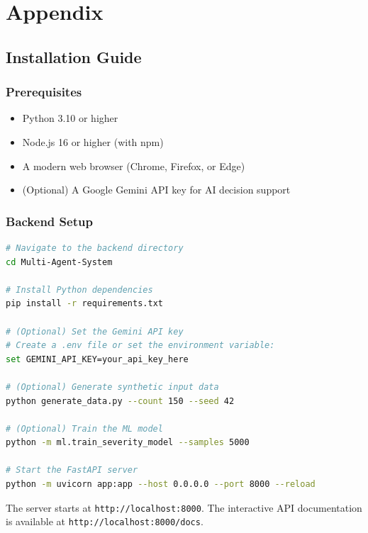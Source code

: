 \appendix

\chapter{Appendix}
\label{ch:appendix}

\section{Installation Guide}
\label{sec:installation_guide}

\subsection{Prerequisites}

\begin{itemize}[leftmargin=*]
    \item Python 3.10 or higher
    \item Node.js 16 or higher (with npm)
    \item A modern web browser (Chrome, Firefox, or Edge)
    \item (Optional) A Google Gemini API key for AI decision support
\end{itemize}

\subsection{Backend Setup}

\begin{lstlisting}[style=codestyle, language=bash, caption=Backend installation and startup]
# Navigate to the backend directory
cd Multi-Agent-System

# Install Python dependencies
pip install -r requirements.txt

# (Optional) Set the Gemini API key
# Create a .env file or set the environment variable:
set GEMINI_API_KEY=your_api_key_here

# (Optional) Generate synthetic input data
python generate_data.py --count 150 --seed 42

# (Optional) Train the ML model
python -m ml.train_severity_model --samples 5000

# Start the FastAPI server
python -m uvicorn app:app --host 0.0.0.0 --port 8000 --reload
\end{lstlisting}

The server starts at \texttt{http://localhost:8000}. The interactive API documentation is available at \texttt{http://localhost:8000/docs}.

